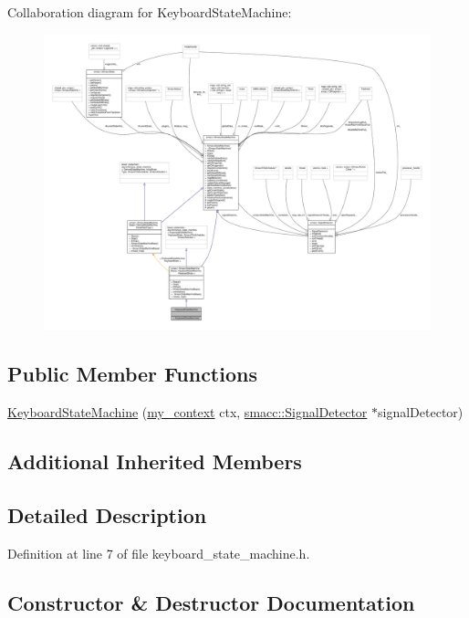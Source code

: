 Collaboration diagram for Keyboard\+State\+Machine\+:
\nopagebreak
\begin{figure}[H]
\begin{center}
\leavevmode
\includegraphics[width=350pt]{structKeyboardStateMachine__coll__graph}
\end{center}
\end{figure}
\subsection*{Public Member Functions}
\begin{DoxyCompactItemize}
\item 
\hyperlink{structKeyboardStateMachine_a710a456a56f0ecb1bbed087420f68050}{Keyboard\+State\+Machine} (\hyperlink{common_8h_af2dcacead80d69b96952496fe413bbfe}{my\+\_\+context} ctx, \hyperlink{classsmacc_1_1SignalDetector}{smacc\+::\+Signal\+Detector} $\ast$signal\+Detector)
\end{DoxyCompactItemize}
\subsection*{Additional Inherited Members}


\subsection{Detailed Description}


Definition at line 7 of file keyboard\+\_\+state\+\_\+machine.\+h.



\subsection{Constructor \& Destructor Documentation}
